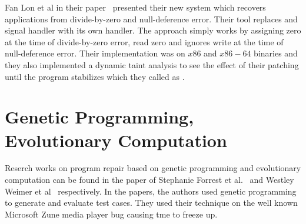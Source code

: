 Fan Lon et al in their paper~\cite{conf/pldi/LongSR14} presented their new
system  which recovers applications from divide-by-zero and
null-deference error. Their tool replaces  and 
signal handler with its own handler. The approach simply works by assigning
zero at the time of divide-by-zero error, read zero and ignores write at the time
of null-deference error. Their implementation was on $x86$ and $x86-64$
binaries and they also implemented a dynamic taint analysis to see the effect of their
patching until the program stabilizes which they called as .

\section{Genetic Programming, Evolutionary Computation}
\label{sec:RecWorksGeneric}

Reserch works on program repair based on genetic programming and evolutionary
computation can be found in the paper of Stephanie Forrest et
al.~\cite{conf/gecco/2009g} and Westley Weimer et
al~\cite{DBLP:journals/cacm/WeimerFGN10} respectively. In the papers, the
authors used genetic programming to generate and evaluate test cases. They used
their technique on the well known Microsoft Zune media player bug causing tme
to freeze up.


